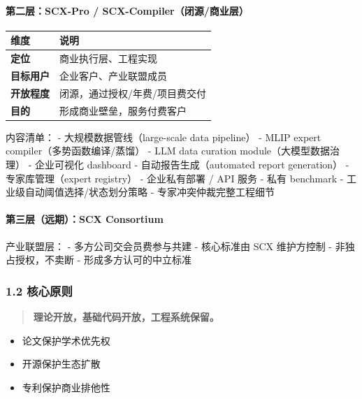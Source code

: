 \documentclass[
  12pt,
]{ctexart}
\providecommand{\tightlist}{%
  \setlength{\itemsep}{0pt}\setlength{\parskip}{0pt}}
\begin{document}
\paragraph{第二层：SCX-Pro /
SCX-Compiler（闭源/商业层）}\label{ux7b2cux4e8cux5c42scx-pro-scx-compilerux95edux6e90ux5546ux4e1aux5c42}

\begin{longtable}[]{@{}ll@{}}
\toprule\noalign{}
维度 & 说明 \\
\midrule\noalign{}
\endhead
\bottomrule\noalign{}
\endlastfoot
\textbf{定位} & 商业执行层、工程实现 \\
\textbf{目标用户} & 企业客户、产业联盟成员 \\
\textbf{开放程度} & 闭源，通过授权/年费/项目费交付 \\
\textbf{目的} & 形成商业壁垒，服务付费客户 \\
\end{longtable}

内容清单： - 大规模数据管线（large-scale data pipeline） - MLIP expert
compiler（多势函数编译/蒸馏） - LLM data curation
module（大模型数据治理） - 企业可视化 dashboard -
自动报告生成（automated report generation） - 专家库管理（expert
registry） - 企业私有部署 / API 服务 - 私有 benchmark -
工业级自动阈值选择/状态划分策略 - 专家冲突仲裁完整工程细节

\paragraph{第三层（远期）：SCX
Consortium}\label{ux7b2cux4e09ux5c42ux8fdcux671fscx-consortium}

产业联盟层： - 多方公司交会员费参与共建 - 核心标准由 SCX 维护方控制 -
非独占授权，不卖断 - 形成多方认可的中立标准

\subsubsection{1.2 核心原则}\label{ux6838ux5fc3ux539fux5219}

\begin{quote}
\textbf{理论开放，基础代码开放，工程系统保留。}
\end{quote}

\begin{itemize}
\tightlist
\item
  论文保护学术优先权
\item
  开源保护生态扩散
\item
  专利保护商业排他性
\end{itemize}
\end{document}
